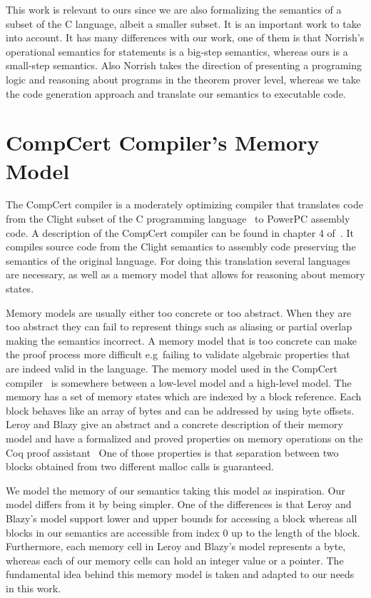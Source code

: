 This work is relevant to ours since we are also formalizing the semantics of a subset of the C language, albeit a smaller subset.
It is an important work to take into account.
It has many differences with our work, one of them is that Norrish's operational semantics for statements is a big-step semantics, whereas ours is a small-step semantics.
Also Norrish takes the direction of presenting a programing logic and reasoning about programs in the theorem prover level, whereas we take the code generation approach and translate our semantics to executable code.


\section{CompCert Compiler's Memory Model}

The CompCert compiler is a moderately optimizing compiler that translates code from the Clight subset of the C programming language~\parencite{clight} to PowerPC assembly code.
A description of the CompCert compiler can be found in chapter 4 of~\parencite{compcert-float-point}.
It compiles source code from the Clight semantics to assembly code preserving the semantics of the original language.
For doing this translation several languages are necessary, as well as a memory model that allows for reasoning about memory states.

Memory models are usually either too concrete or too abstract.
When they are too abstract they can fail to represent things such as aliasing or partial overlap making the semantics incorrect.
A memory model that is too concrete can make the proof process more difficult e.g\ failing to validate algebraic properties that are indeed valid in the language.
The memory model used in the CompCert compiler~\parencite{leroy-blazy-memory-model} is somewhere between a low-level model and a high-level model.
The memory has a set of memory states which are indexed by a block reference.
Each block behaves like an array of bytes and can be addressed by using byte offsets.
Leroy and Blazy give an abstract and a concrete description of their memory model and have a formalized and proved properties on memory operations on the Coq proof assistant~\parencite{coq-doc}
One of those properties is that separation between two blocks obtained from two different malloc calls is guaranteed.

We model the memory of our semantics taking this model as inspiration.
Our model differs from it by being simpler.
One of the differences is that Leroy and Blazy's model support lower and upper bounds for accessing a block whereas all blocks in our semantics are accessible from index $0$ up to the length of the block.
Furthermore, each memory cell in Leroy and Blazy's model represents a byte, whereas each of our memory cells can hold an integer value or a pointer.
The fundamental idea behind this memory model is taken and adapted to our needs in this work.


